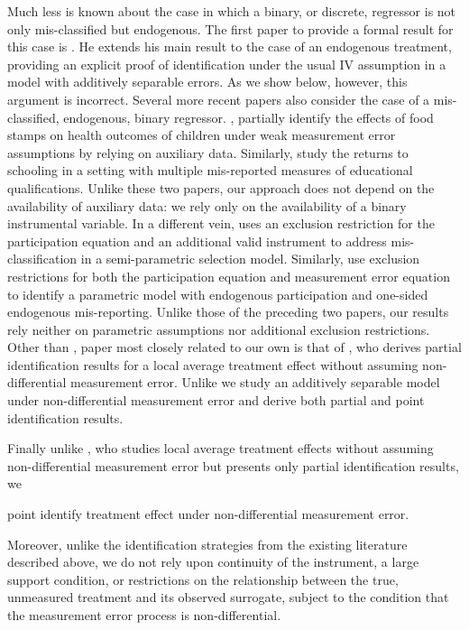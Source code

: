 Much less is known about the case in which a binary, or discrete, regressor is not only mis-classified but endogenous.
The first paper to provide a formal result for this case is \cite{Mahajan}.
He extends his main result to the case of an endogenous treatment, providing an explicit proof of identification under the usual IV assumption in a model with additively separable errors.
As we show below, however, this argument is incorrect.
Several more recent papers also consider the case of a mis-classified, endogenous, binary regressor.
\cite{kreider2012}, partially identify the effects of food stamps on health outcomes of children under weak measurement error assumptions by relying on auxiliary data.
Similarly, \cite{Battistin} study the returns to schooling in a setting with multiple mis-reported measures of educational qualifications.
Unlike these two papers, our approach does not depend on the availability of auxiliary data: we rely only on the availability of a binary instrumental variable. 
In a different vein, \cite{shiu2015} uses an exclusion restriction for the participation equation and an additional valid instrument to address mis-classification in a semi-parametric selection model.
Similarly, \cite{nguimkeu2016estimation} use exclusion restrictions for both the participation equation and measurement error equation to identify a parametric model with endogenous participation and one-sided endogenous mis-reporting. 
Unlike those of the preceding two papers, our results rely neither on parametric assumptions nor additional exclusion restrictions.
Other than \cite{Mahajan}, paper most closely related to our own is that of \cite{Ura}, who derives partial identification results for a local average treatment effect without assuming non-differential measurement error.
Unlike \cite{Ura} we study an additively separable model under non-differential measurement error and derive both partial and point identification results.




Finally unlike \cite{Ura}, who studies local average treatment effects without assuming non-differential measurement error but presents only partial identification results, we 

point identify treatment effect under non-differential measurement error.

Moreover, unlike the identification strategies from the existing literature described above, we do not rely upon continuity of the instrument, a large support condition, or restrictions on the relationship between the true, unmeasured treatment and its observed surrogate, subject to the condition that the measurement error process is non-differential.


